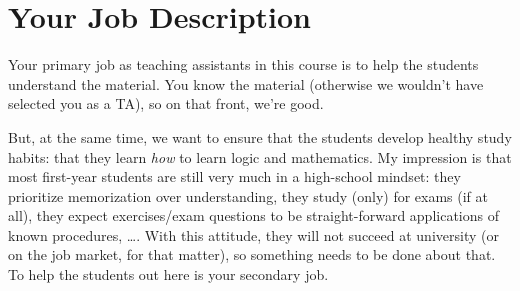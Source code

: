 \section*{Your Job Description}

Your primary job as teaching assistants in this course is to help the students understand the material. You know the material (otherwise we wouldn't have selected you as a TA), so on that front, we're good.

But, at the same time, we want to ensure that the students develop healthy study habits: that they learn \emph{how} to learn logic and mathematics.
My impression is that most first-year students are still very much in a high-school mindset:
they prioritize memorization over understanding,
they study (only) for exams (if at all),
they expect exercises/exam questions to be straight-forward applications of known procedures,
\dots.
With this attitude,
they will not succeed at university (or on the job market, for that matter),
so something needs to be done about that.
To help the students out here is your secondary job.

